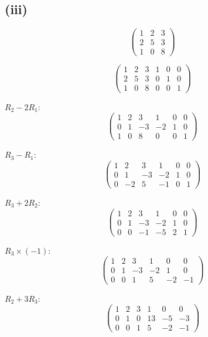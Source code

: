 \subsection*{(iii)}
\[
	\begin{pmatrix}
		1 & 2 & 3 \\
		2 & 5 & 3 \\
		1 & 0 & 8
	\end{pmatrix}
\]

\[
	\left(\begin{array}{ccc|ccc}
			1 & 2 & 3 & 1 & 0 & 0 \\
			2 & 5 & 3 & 0 & 1 & 0 \\
			1 & 0 & 8 & 0 & 0 & 1
		\end{array}\right)
\]

$R_2 - 2R_1$:
\[
	\left(\begin{array}{ccc|ccc}
			1 & 2  & 3  & 1  & 0 & 0 \\
			0 & 1  & -3 & -2 & 1 & 0 \\
			1 & 0 & 8 & 0 & 0 & 1
		\end{array}\right)
\]

$R_3 - R_1$:
\[
	\left(\begin{array}{ccc|ccc}
			1 & 2  & 3  & 1  & 0 & 0 \\
			0 & 1  & -3 & -2 & 1 & 0 \\
			0 & -2 & 5  & -1 & 0 & 1
		\end{array}\right)
\]

$R_3 + 2R_2$:
\[
	\left(\begin{array}{ccc|ccc}
			1 & 2 & 3  & 1  & 0 & 0 \\
			0 & 1 & -3 & -2 & 1 & 0 \\
			0 & 0 & -1 & -5 & 2 & 1
		\end{array}\right)
\]

$R_3 \times (-1)$:
\[
	\left(\begin{array}{ccc|ccc}
			1 & 2 & 3  & 1  & 0  & 0  \\
			0 & 1 & -3 & -2 & 1  & 0  \\
			0 & 0 & 1  & 5  & -2 & -1
		\end{array}\right)
\]

$R_2 + 3R_3$:
\[
	\left(\begin{array}{ccc|ccc}
			1 & 2 & 3 & 1 & 0  & 0  \\
			0 & 1 & 0 & 13  & -5 & -3 \\
			0 & 0 & 1  & 5  & -2 & -1
		\end{array}\right)
\]

